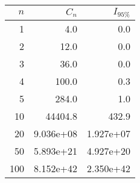 \begin{tabular}{rrr}
\toprule
 $n$ &     $C_n$ &  $I_{95\%}$ \\
\midrule
   1 &       4.0 &         0.0 \\
   2 &      12.0 &         0.0 \\
   3 &      36.0 &         0.0 \\
   4 &     100.0 &         0.3 \\
   5 &     284.0 &         1.0 \\
  10 &   44404.8 &       432.9 \\
  20 & 9.036e+08 &   1.927e+07 \\
  50 & 5.893e+21 &   4.927e+20 \\
 100 & 8.152e+42 &   2.350e+42 \\
\bottomrule
\end{tabular}
